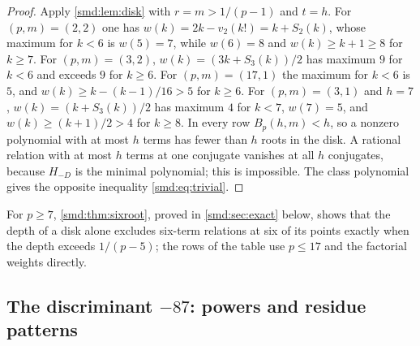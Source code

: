 \begin{proof}
Apply \cref{smd:lem:disk} with $r=m>1/(p-1)$ and $t=h$. For $(p,m)=(2,2)$ one has
$w(k)=2k-v_2(k!)=k+S_2(k)$, whose maximum for $k<6$ is $w(5)=7$, while $w(6)=8$ and
$w(k)\ge k+1\ge8$ for $k\ge7$. For $(p,m)=(3,2)$, $w(k)=(3k+S_3(k))/2$ has maximum $9$ for
$k<6$ and exceeds $9$ for $k\ge6$. For $(p,m)=(17,1)$ the maximum for $k<6$ is $5$, and
$w(k)\ge k-(k-1)/16>5$ for $k\ge6$. For $(p,m)=(3,1)$ and $h=7$, $w(k)=(k+S_3(k))/2$ has
maximum $4$ for $k<7$, $w(7)=5$, and $w(k)\ge(k+1)/2>4$ for $k\ge8$. In every row
$B_p(h,m)<h$, so a nonzero polynomial with at most $h$ terms has fewer than $h$ roots in the
disk. A rational relation with at most $h$ terms at one conjugate vanishes at all $h$
conjugates, because $H_{-D}$ is the minimal polynomial; this is impossible. The class
polynomial gives the opposite inequality \eqref{smd:eq:trivial}.
\end{proof}



For $p\ge7$, \cref{smd:thm:sixroot}, proved in \cref{smd:sec:exact} below, shows that the depth of a disk alone excludes six-term
relations at six of its points exactly when the depth exceeds $1/(p-5)$; the rows of the
table use $p\le17$ and the factorial weights directly.

\subsection{The discriminant \texorpdfstring{$-87$}{-87}: powers and residue patterns}\label{smd:sec:powered}
{\raggedright{}}

